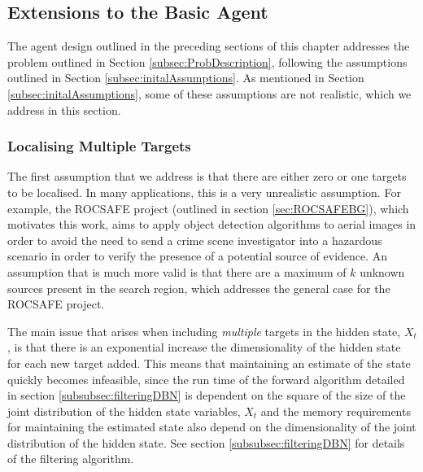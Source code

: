 \subsection{Extensions to the Basic Agent}
The agent design outlined in the preceding sections of this chapter addresses the problem outlined in Section \ref{subsec:ProbDescription},  following the assumptions outlined in Section \ref{subsec:initalAssumptions}. As mentioned in Section \ref{subsec:initalAssumptions}, some of these assumptions are not realistic, which we address in this section. \par

\subsubsection{Localising Multiple Targets}
The first assumption that we address is that there are either zero or one targets to be localised. In many applications, this is a very unrealistic assumption. For example, the ROCSAFE project (outlined in section \ref{sec:ROCSAFEBG}), which motivates this work, aims to apply object detection algorithms to aerial images in order to avoid the need to send a crime scene investigator into a hazardous scenario in order to verify the presence of a potential source of evidence. An assumption that is much more valid is that there are a maximum of $k$ unknown sources present in the search region, which addresses the general case for the ROCSAFE  project.\par

The main issue that arises when including \textit{multiple} targets in the hidden state, $X_t$, is that there is an exponential increase the dimensionality of the hidden state for each new target added. This means that maintaining an estimate of the state quickly becomes infeasible, since the run time of the forward algorithm detailed in section \ref{subsubsec:filteringDBN} is dependent on the square of the size of the joint distribution of the hidden state variables, $X_t$ and the memory requirements for maintaining the estimated state also depend on the dimensionality of the joint distribution of the hidden state. See section \ref{subsubsec:filteringDBN} for details of the filtering algorithm.


